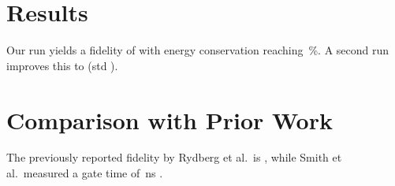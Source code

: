 \documentclass{article}
\begin{document}
\section{Results}

Our run yields a fidelity of  with energy
conservation reaching \,\%.
A second run improves this to  (std
).

\section{Comparison with Prior Work}

The previously reported fidelity by Rydberg et al.\ is
 \cite{rydberg2024}, while Smith et al.\ measured
a gate time of \,ns \cite{smith2023}.

\end{document}
